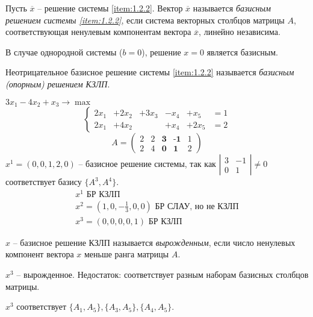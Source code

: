 \begin{definition}
    Пусть $ \overline{x} $ -- решение системы \ref{item:1.2.2}. Вектор $ \overline{x} $ называется \emph{базисным решением системы \ref{item:1.2.2}}, если система векторных столбцов матрицы $ A $, соответствующая ненулевым компонентам вектора $ \overline{x} $, линейно независима.
\end{definition}

\begin{remark}
    В случае однородной системы ($ b = 0 $), решение $ x = 0 $ является базисным.
\end{remark}

\begin{definition}
    Неотрицательное базисное решение системы \ref{item:1.2.2} называется \emph{базисным (опорным) решением КЗЛП}.
\end{definition}

\begin{example}
    $ 3x_1 - 4x_2 + x_3 \rightarrow \max $
    \[
        \left\{\begin{array}{cccccc}
            2x_1 & + 2x_2 & + 3x_3 & - x_4 & + x_5  & = 1 \\
            2x_1 & + 4x_2 &        & + x_4 & + 2x_5 & = 2
        \end{array}\right.
    \]
    \[
        A = \left(\begin{matrix}
                2 & 2 & \textbf{3} & \textbf{-1} & 1 \\
                2 & 4 & \textbf{0} & \textbf{1}  & 2
            \end{matrix}\right)
    \]
    $ x^1 = (0,0,1,2,0) $ -- базисное решение системы, так как $ \left|\begin{matrix}
            3 & -1 \\ 0 & 1
        \end{matrix}\right| \ne 0 $ соответствует базису $ \{A^3,A^4\} $.
    \[
        \begin{array}{l}
            x^1 \text{ БР КЗЛП}                                                 \\
            x^2 = \left(1,0,-\frac{1}{3},0,0\right) \text{ БР СЛАУ, но не КЗЛП} \\
            x^3 = (0,0,0,0,1) \text{ БР КЗЛП}
        \end{array}
    \]
\end{example}

\begin{definition}
    $ x $ -- базисное решение КЗЛП называется \emph{вырожденным}, если число ненулевых компонент вектора $ x $ меньше ранга матрицы $ A $.
\end{definition}

\begin{remark}
    $ x^3 $ -- вырожденное. Недостаток: соответствует разным наборам базисных столбцов матрицы.

    $ x^3 $ соответствует $ \{A_1,A_5\}, \{A_3,A_5\}, \{A_4,A_5\} $.
\end{remark}
